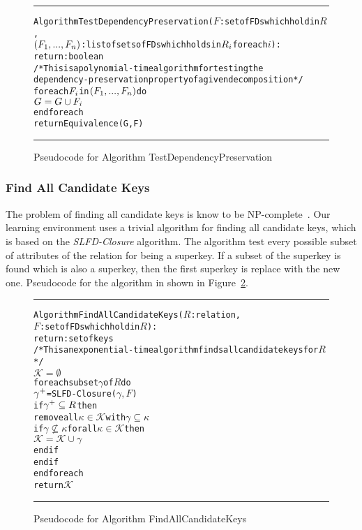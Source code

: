 \begin{figure}[htbp]
\hrule
\vspace{0.25cm}
\begin{alltt}
Algorithm TestDependencyPreservation(\(F\): set of FDs which hold in \(R\),
           \((F\sb{1},...,F\sb{n})\): list of sets of FDs which holds in \(R\sb{i}\) for each \(i\)):
          return: boolean
/* This is a polynomial-time algorithm for testing the 
dependency-preservation property of a given decomposition */
  for each \(F\sb{i}\) in \((F\sb{1},...,F\sb{n})\) do
    \(G = G \cup F\sb{i}\)
  end foreach
  return Equivalence(G,F)
\end{alltt}
\caption{Pseudocode for Algorithm TestDependencyPreservation}\label{fig:dptest}
\hrule
\end{figure}

\subsubsection{Find All Candidate Keys}
The problem of finding all candidate keys is know to be NP-complete~\cite{p3}. 
Our learning environment uses a trivial algorithm for finding all candidate keys,
which is based on the \textit{SLFD-Closure} algorithm. The algorithm test every possible
subset of attributes of the relation for being a superkey. If a subset of the superkey
is found which is also a superkey, then the first superkey is replace with the new one.  
Pseudocode for the algorithm in shown in Figure~\ref{alg:findkeys}. 

\begin{figure}[htbp]
\hrule
\vspace{0.25cm}
\begin{alltt}
Algorithm FindAllCandidateKeys(\(R\): relation,
              \(F\): set of FDs which hold in \(R\)):
            return: set of keys
/* This an exponential-time algorithm finds all candidate keys for \(R\)*/             
  \(\mathcal{K} = \emptyset\)
  foreach subset \(\gamma\) of \(R\) do
    \(\gamma\sp{+}\) = SLFD-Closure(\(\gamma, F\))
    if \(\gamma\sp{+} \subseteq R\) then
      remove all \(\kappa \in \mathcal{K}\) with  \(\gamma \subseteq \kappa\)
      if \(\gamma \nsubseteq \kappa\) for all \(\kappa \in \mathcal{K}\) then
        \(\mathcal{K} = \mathcal{K} \cup \gamma\)
      end if
    end if
  end foreach
  return \(\mathcal{K}\)
\end{alltt}
\caption{Pseudocode for Algorithm FindAllCandidateKeys}\label{alg:findkeys}
\hrule
\end{figure}


